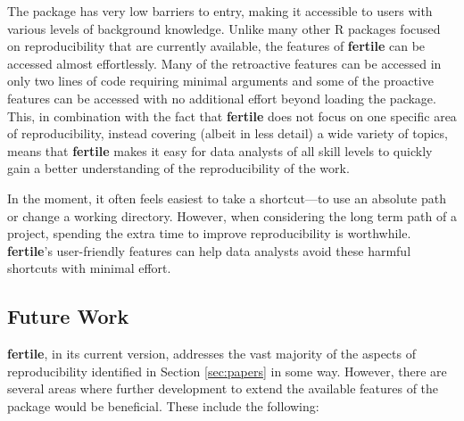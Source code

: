 \documentclass[APA,LATO1COL]{WileyNJD-v2}\usepackage[]{graphicx}\usepackage[]{color}
\newcommand{\R}{\textsf{R}\xspace}
\newcommand{\pkg}[1]{\textbf{#1}}
\begin{document}
The package has very low barriers to entry, making it accessible to users with various levels of background knowledge. Unlike many other \R packages focused on reproducibility that are currently available, the features of \pkg{fertile} can be accessed almost effortlessly. Many of the retroactive features can be accessed in only two lines of code requiring minimal arguments and some of the proactive features can be accessed with no additional effort beyond loading the package. This, in combination with the fact that \pkg{fertile} does not focus on one specific area of reproducibility, instead covering (albeit in less detail) a wide variety of topics, means that \pkg{fertile} makes it easy for data analysts of all skill levels to quickly gain a better understanding of the reproducibility of the work.

In the moment, it often feels easiest to take a shortcut---to use an absolute path or change a working directory. However, when considering the long term path of a project, spending the extra time to improve reproducibility is worthwhile. \pkg{fertile}'s user-friendly features can help data analysts avoid these harmful shortcuts with minimal effort.

\subsection{Future Work}\label{sec:future}

\pkg{fertile}, in its current version, addresses the vast majority of the aspects of reproducibility identified in Section \ref{sec:papers} in some way. However, there are several areas where further development to extend the available features of the package would be beneficial. These include the following:
\end{document}
